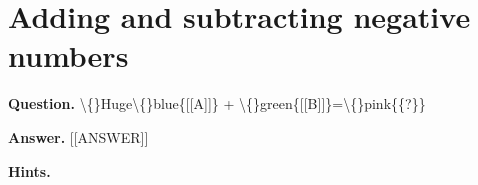 \documentclass{article}
\begin{document}
\section*{Adding and subtracting negative numbers}
\textbf{Question.} \textbackslash\{\}Huge\textbackslash\{\}blue\{[[A]]\} + \textbackslash\{\}green\{[[B]]\}=\textbackslash\{\}pink\{\{?\}\}

\textbf{Answer.} [[ANSWER]]

\textbf{Hints.}
\begin{itemize}

\end{itemize}
\end{document}
